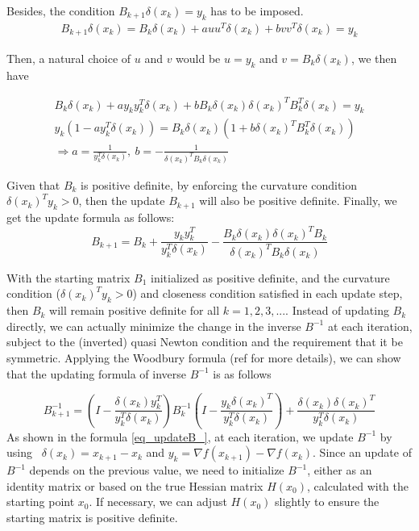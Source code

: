 \documentclass  [
  paper    = a4,
  BCOR     = 10mm,
  twoside,
  fontsize = 12pt,
  fleqn,
  toc      = bibnumbered,
  toc      = listofnumbered,
  numbers  = noendperiod,
  headings = normal,
  listof   = leveldown,
  version  = 3.03
]                                       {scrreprt}
\newcommand{\<}{\langle}
\renewcommand{\>}{\rangle}
\begin{document}
Besides, the condition $B_{k+1}\delta(x_k) = y_k$ has to be imposed.
\begin{align*}
	B_{k+1}\delta(x_k) = B_k\delta(x_k)  + a u u^T\delta(x_k) + b v v^T\delta(x_k) = y_k
\end{align*}

Then, a natural choice of $u$ and $v$ would be $u=y_k$ and $v=B_k\delta(x_k)$, we then have

\begin{align*}
	B_k\delta(x_k) + a y_ky^T_k\delta(x_k) + bB_k\delta(x_k) \delta(x_k)^TB_k^T\delta(x_k) = y_k  \\
	y_k(1-ay_k^T\delta(x_k) ) = B_k\delta(x_k)(1+ b \delta(x_k)^TB_k^T\delta(x_k)) \\
	\Rightarrow a = \frac{1}{y_k^T\delta(x_k)}, \  b= - \frac{1}{\delta(x_k)^TB_k\delta(x_k)}
\end{align*}

Given that $B_k$ is  positive definite, by enforcing the curvature condition $\delta(x_k)^Ty_k >0$, then the update $B_{k+1}$ will also be positive definite.  Finally, we get the update formula as follows: 
\begin{equation}
	B_{k+1} = B_k +  \frac{y_ky_k^T}{y_k^T\delta(x_k)}  - \frac{B_k\delta(x_k)\delta(x_k)^TB_k}{\delta(x_k)^TB_k\delta(x_k)}
	\label{eq_UpdateB}
\end{equation}

With the starting matrix $B_1$ initialized as positive definite, and the curvature condition ($\delta(x_k)^Ty_k >0$) and closeness condition satisfied in each update step, then $B_k$ will remain positive definite for all $k = 1,2, 3, ...$. Instead of updating $B_k$ directly, we can actually minimize the change in the inverse $B^{-1}$ at each iteration, subject to the (inverted) quasi Newton condition and the requirement that it be symmetric. Applying the Woodbury formula (ref \cite{Wood50} for more details), we can show that the updating formula of inverse $B^{-1}$ is as follows

\begin{equation}
	B_{k+1}^{-1} = (I - \frac{\delta(x_k)y_k^T}{y_k^T\delta(x_k)})B_k^{-1}(I - \frac{y_k\delta(x_k)^T}{y_k^T\delta(x_k)}) +  \frac{\delta(x_k)\delta(x_k)^T}{y_k^T\delta(x_k)} 
	\label{eq_updateB_}
\end{equation}
As shown in the formula \ref{eq_updateB_}, at each iteration, we update $B^{-1}$ by using  $\delta(x_k) = x_{k+1} -x_k$ and $y_k = \nabla f(x_{k+1}) - \nabla f(x_k)$. Since an update of $B^{-1}$ depends on the previous value, we need to initialize $B^{-1}$, either as an identity matrix or based on the true Hessian matrix $H(x_0)$, calculated with the starting point $x_0$. If necessary, we can adjust $H(x_0)$ slightly to ensure the starting matrix is positive definite.
\end{document}
